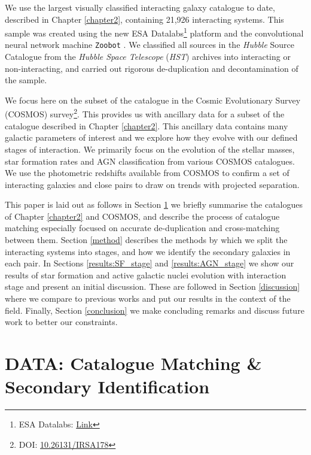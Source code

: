 We use the largest visually classified interacting galaxy catalogue to date, described in Chapter \ref{chapter2}, containing 21,926 interacting systems. This sample was created using the new ESA Datalabs\footnote{ESA Datalabs: \href{https://datalabs.esa.int/}{Link}} platform and the convolutional neural network machine \texttt{Zoobot} \citep{2022MNRAS.509.3966W, 2023JOSS....8.5312W}. We classified all sources in the \emph{Hubble} Source Catalogue \citep{2016AJ....151..134W} from the \emph{Hubble Space Telescope} (\emph{HST}) archives into interacting or non-interacting, and carried out rigorous de-duplication and decontamination of the sample.

We focus here on the subset of the catalogue in the Cosmic Evolutionary Survey (COSMOS) survey\footnote{DOI: \href{https://www.ipac.caltech.edu/doi/irsa/10.26131/IRSA178}{10.26131/IRSA178}}. This provides us with ancillary data for a subset of the catalogue described in Chapter \ref{chapter2}. This ancillary data contains many galactic parameters of interest and we explore how they evolve with our defined stages of interaction. We primarily focus on the evolution of the stellar masses, star formation rates and AGN classification from various COSMOS catalogues. We use the photometric redshifts available from COSMOS to confirm a set of interacting galaxies and close pairs to draw on trends with projected separation.

This paper is laid out as follows in Section \ref{data} we briefly summarise the catalogues of Chapter \ref{chapter2} and COSMOS, and describe the process of catalogue matching especially focused on accurate de-duplication and cross-matching between them.  Section \ref{method} describes the methods by which we split the interacting systems into stages, and how we identify the secondary galaxies in each pair. In Sections \ref{results:SF_stage} and \ref{results:AGN_stage} we show our results of star formation and active galactic nuclei evolution with interaction stage and present an initial discussion. These are followed in Section \ref{discussion} where we compare to previous works and put our results in the context of the field. Finally, Section \ref{conclusion} we make concluding remarks and discuss future work to better our constraints. 

\section{DATA: Catalogue Matching \& Secondary Identification} \label{data}
